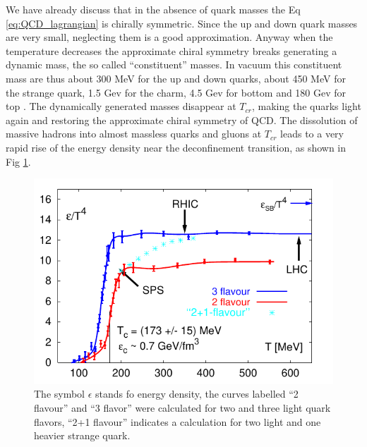 \documentclass[12pt,a4paper]{book}
\begin{document}
	We have already discuss that in the absence of quark masses the Eq \ref{eq:QCD_lagrangian} is chirally symmetric. Since the up and down quark masses are very small, neglecting them is a good approximation. Anyway when the temperature decreases the approximate chiral symmetry breaks generating a dynamic mass, the so called “constituent” masses. In vacuum this constituent mass are thus about 300 MeV for the up and down quarks, about 450 MeV for the strange quark, 1.5 Gev for the charm, 4.5 Gev for bottom and 180 Gev for top \cite{Semprini}. The dynamically generated masses disappear at $T_{cr}$, making the quarks light again and restoring the approximate chiral symmetry of QCD. The dissolution of massive hadrons into almost massless quarks and gluons at $T_{cr}$ leads to a very rapid rise of the energy density near the deconfinement transition, as shown in Fig \ref{fig:deconfinement}.
	\begin{figure}[ht]
		\centering
		\includegraphics[width=0.7\linewidth]{pictures/deconfinement.png}
		\caption{The symbol $\epsilon$ stands fo energy density, the curves labelled “2 flavour” and “3 flavor” were calculated for two and three light quark flavors, “2+1 flavour” indicates a calculation for two light and one heavier strange quark.}
		\label{fig:deconfinement} 
	\end{figure}
\end{document}
